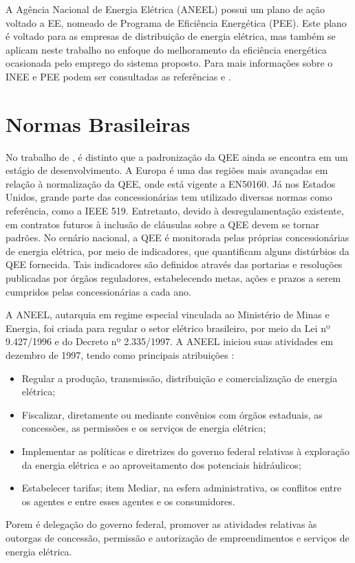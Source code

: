 \par
A Agência Nacional de Energia Elétrica (ANEEL) possui um plano de ação voltado a EE, nomeado de Programa de Eficiência Energética (PEE). Este plano é voltado para as empresas de distribuição de energia elétrica, mas também se aplicam neste trabalho no enfoque do melhoramento da eficiência energética ocasionada pelo emprego do sistema proposto. Para mais informações sobre o INEE e PEE podem ser consultadas as referências \cite{INE12} e \cite{ANEE3}.

\section{Normas Brasileiras}\label{qeenormas}
\par
No trabalho de \cite{JUN09}, é distinto que a padronização da QEE ainda se encontra em um estágio de desenvolvimento. A Europa é uma das regiões mais avançadas em relação à normalização da QEE, onde está vigente a EN50160. Já nos Estados Unidos, grande parte das concessionárias tem utilizado diversas normas como referência, como a IEEE 519. Entretanto, devido à desregulamentação existente, em contratos futuros à inclusão de cláusulas sobre a QEE devem se tornar padrões.
No cenário nacional, a QEE é monitorada pelas próprias concessionárias de energia elétrica, por meio de indicadores, que quantificam alguns distúrbios da QEE fornecida. Tais indicadores são definidos através das portarias e resoluções publicadas por órgãos reguladores, estabelecendo metas, ações e prazos a serem cumpridos pelas concessionárias a cada ano.
\par
A ANEEL, autarquia em regime especial vinculada ao Ministério de Minas e Energia, foi criada para regular o setor elétrico brasileiro, por meio da Lei nº 9.427/1996 e do Decreto nº 2.335/1997. A ANEEL iniciou suas atividades em dezembro de 1997, tendo como principais atribuições \cite{ANEEL}:
\begin{itemize}
\item Regular a produção, transmissão, distribuição e comercialização de energia elétrica;
\item Fiscalizar, diretamente ou mediante convênios com órgãos estaduais, as concessões, as permissões e os serviços de energia elétrica;
\item Implementar as políticas e diretrizes do governo federal relativas à exploração da energia elétrica e ao aproveitamento dos potenciais hidráulicos;
\item Estabelecer tarifas;
item Mediar, na esfera administrativa, os conflitos entre os agentes e entre esses agentes e os consumidores.
\end{itemize}
\par
Porem é delegação do governo federal, promover as atividades relativas às outorgas de concessão, permissão e autorização de empreendimentos e serviços de energia elétrica.

